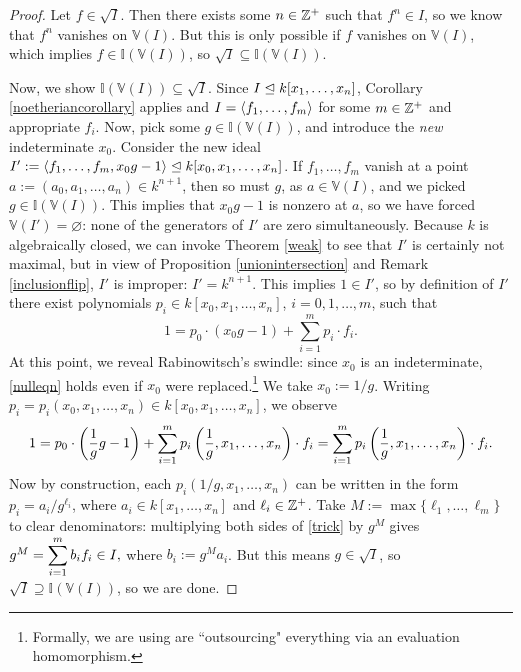 \documentclass{article}
\newcommand{\V}{\mathbb V}
\newcommand{\I}{\mathbb I}
\begin{document}
\begin{proof}
Let $f\in \sqrt I$. Then there exists some $n\in\mathbb Z^+$ such that $f^n\in I$, so we know that $f^n$ vanishes on $\V(I)$. But this is only possible if $f$ vanishes on $\V(I)$, which implies $f\in \I(\V(I))$, so $\sqrt I\subseteq \I(\V(I))$.

Now, we show $\I(\V(I))\subseteq \sqrt I$. Since $I\trianglelefteq k[x_1,\ldots, x_n]$, Corollary \ref{noetheriancorollary} applies and $I = \left\langle f_1, \ldots, f_m\right\rangle$ for some $m\in\mathbb Z^+$ and appropriate $f_i$. Now, pick some $g\in \I(\V(I))$, and introduce the \textit{new} indeterminate $x_0$. Consider the new ideal $I' := \left\langle f_1, \ldots, f_m, x_0g-1\right\rangle \trianglelefteq k[x_0, x_1,\ldots, x_n]$. If $f_1,\ldots, f_m$ vanish at a point $a := (a_0, a_1,\ldots, a_n)\in k^{n+1}$, then so must $g$, as $a\in \V(I)$, and we picked $g\in \I(\V(I))$. This implies that $x_0g-1$ is nonzero at $a$, so we have forced $\V(I') = \varnothing$: none of the generators of $I'$ are zero simultaneously. Because $k$ is algebraically closed, we can invoke Theorem \ref{weak} to see that $I'$ is certainly not maximal, but in view of Proposition \ref{unionintersection} and Remark \ref{inclusionflip}, $I'$ is improper: $I' = k^{n+1}$. This implies $1\in I'$, so by definition of $I'$ there exist polynomials $p_i\in k[x_0, x_1,\ldots, x_n]$, $i = 0, 1, \ldots, m$, such that
\begin{equation}\label{nulleqn}
1 = p_0\cdot (x_0g-1) +\sum_{i=1}^m p_i\cdot f_i.
\end{equation}
At this point, we reveal Rabinowitsch's swindle: since $x_0$ is an indeterminate, \eqref{nulleqn} holds even if $x_0$ were replaced.\footnote{Formally, we are using are ``outsourcing" everything via an evaluation homomorphism.} We take $x_0 := 1/g$. Writing $p_i = p_i(x_0, x_1, \ldots, x_n) \in k[x_0, x_1,\ldots, x_n]$, we observe
\begin{equation}\label{trick}
1 = p_0\cdot \left(\frac 1gg-1 \right) + \sum_{i=1}^m p_i\left(\frac 1g, x_1, \ldots, x_n \right)\cdot f_i = \sum_{i=1}^m p_i\left(\frac 1g, x_1,\ldots, x_n \right)\cdot f_i.
\end{equation}
Now by construction, each $p_i(1/g, x_1,\ldots, x_n)$ can be written in the form $p_i = a_i/g^{\ell_i}$, where $a_i\in k[x_1,\ldots, x_n]$ and $\ell_i\in\mathbb Z^+$. Take $M := \max\{\ell_1, \ldots, \ell_m\}$ to clear denominators: multiplying both sides of \eqref{trick} by $g^M$ gives $g^M = \displaystyle\sum_{i=1}^m b_if_i\in I,$ where $b_i := g^Ma_i$. But this means $g\in \sqrt I$, so $\sqrt I\supseteq \I(\V(I))$, so we are done.
\end{proof}
\end{document}
